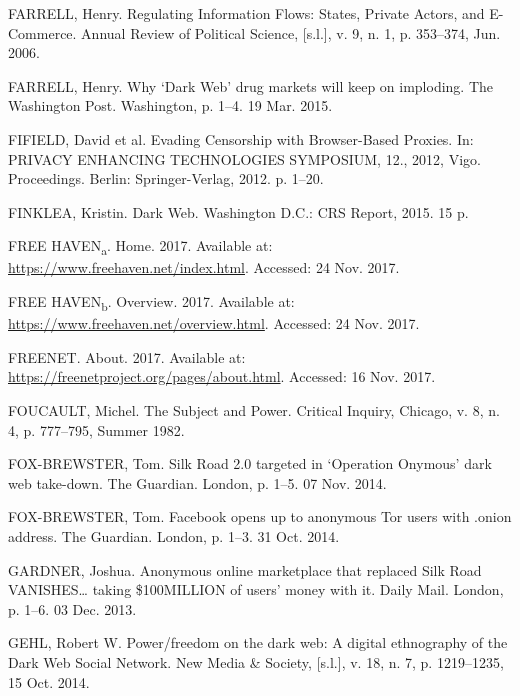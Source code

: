 \begin{list}{}{\setlength{\leftmargin}{0pt}\setlength{\itemsep}{6pt}\setlength{\parsep}{0pt}}
\item FARRELL, Henry. Regulating Information Flows: States, Private Actors, and E-Commerce. Annual Review of Political Science, [s.l.], v. 9, n. 1, p. 353--374, Jun. 2006.

\item FARRELL, Henry. Why `Dark Web' drug markets will keep on imploding. The Washington Post. Washington, p. 1--4. 19 Mar. 2015.

\item FIFIELD, David et al. Evading Censorship with Browser-Based Proxies. In: PRIVACY ENHANCING TECHNOLOGIES SYMPOSIUM, 12., 2012, Vigo. Proceedings. Berlin: Springer-Verlag, 2012. p. 1--20.

\item FINKLEA, Kristin. Dark Web. Washington D.C.: CRS Report, 2015. 15 p.

\item FREE HAVEN\textsubscript{a}. Home. 2017. Available at: \url{https://www.freehaven.net/index.html}. Accessed: 24 Nov. 2017.

\item FREE HAVEN\textsubscript{b}. Overview. 2017. Available at: \url{https://www.freehaven.net/overview.html}. Accessed: 24 Nov. 2017.

\item FREENET. About. 2017. Available at: \url{https://freenetproject.org/pages/about.html}. Accessed: 16 Nov. 2017.

\item FOUCAULT, Michel. The Subject and Power. Critical Inquiry, Chicago, v. 8, n. 4, p. 777--795, Summer 1982.

\item FOX-BREWSTER, Tom. Silk Road 2.0 targeted in `Operation Onymous' dark web take-down. The Guardian. London, p. 1--5. 07 Nov. 2014.

\item FOX-BREWSTER, Tom. Facebook opens up to anonymous Tor users with .onion address. The Guardian. London, p. 1--3. 31 Oct. 2014.

\item GARDNER, Joshua. Anonymous online marketplace that replaced Silk Road VANISHES\ldots{} taking \$100MILLION of users' money with it. Daily Mail. London, p. 1--6. 03 Dec. 2013.

\item GEHL, Robert W. Power/freedom on the dark web: A digital ethnography of the Dark Web Social Network. New Media \& Society, [s.l.], v. 18, n. 7, p. 1219--1235, 15 Oct. 2014.


\end{list}
